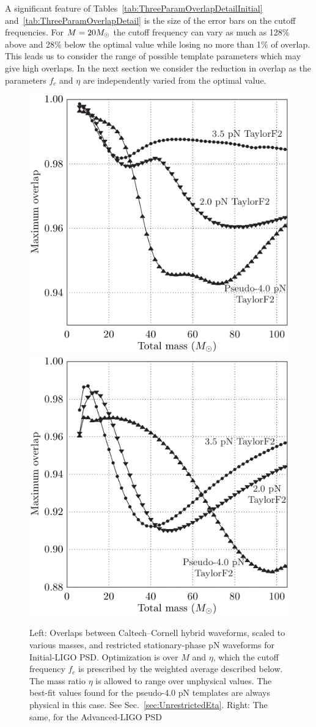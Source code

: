 

A significant feature of
Tables~\ref{tab:ThreeParamOverlapDetailInitial}
and~\ref{tab:ThreeParamOverlapDetail} is the size of the error bars on
the cutoff frequencies.  For $M=20 M_{\odot}$ the cutoff frequency can
vary as much as 128\% above and 28\% below the optimal value while
losing no more than 1\% of overlap. This leads us to consider the
range of possible template parameters which may give high overlaps.
In the next section we consider the reduction in overlap as the
parameters $f_{c}$ and $\eta$ are independently varied from the
optimal value.

\begin{figure}
  \includegraphics[width=0.5\linewidth]{figures/comparison/ThreeParamOverlapSummaryInitial}
  \includegraphics[width=0.5\linewidth]{figures/comparison/ThreeParamOverlapSummaryAdvanced}
  \caption[ Overlaps between Caltech--Cornell hybrid waveforms and pN waveforms]{
  \label{fig:ThreeParamOverlapSummaries}
    Left: Overlaps between Caltech--Cornell hybrid waveforms,
    scaled to various masses, and restricted stationary-phase pN
    waveforms for Initial-LIGO PSD. Optimization is over $M$ and
    $\eta$, which the cutoff frequency $f_{c}$ is prescribed by the
    weighted average described below.  The mass ratio $\eta$ is
    allowed to range over unphysical values.  The best-fit values
    found for the pseudo-4.0 pN templates are always physical in this
    case.  See Sec.~\ref{sec:UnrestrictedEta}.  Right: The same, for
    the Advanced-LIGO PSD}
\end{figure}%


